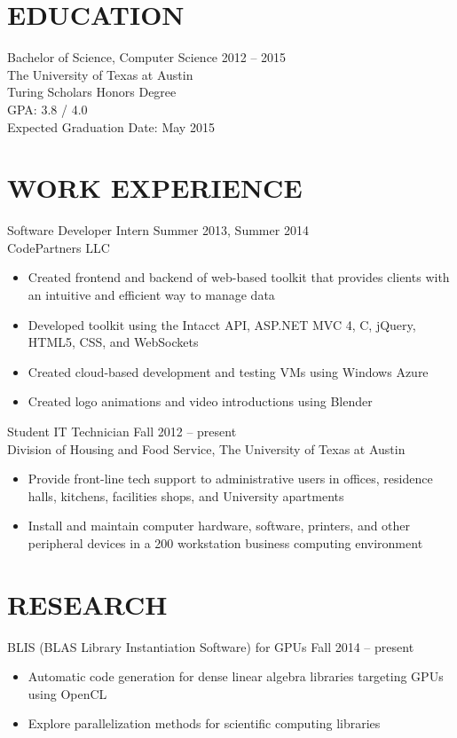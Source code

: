 \documentclass[margin]{res}
\newcommand{\PLUS}{\nolinebreak\hspace{-.05em}\raisebox{.4ex}{\tiny\bf+}}
\newcommand{\CS}{C\nolinebreak\hspace{-.05em}\raisebox{.4ex}{\scriptsize\bf \#}}
\begin{document}
\begin{resume}
 
\section{EDUCATION}
	Bachelor of Science, Computer Science \hfill 2012 -- 2015\\
	The University of Texas at Austin\\
	Turing Scholars Honors Degree\\
	GPA: 3.8 / 4.0\\
	Expected Graduation Date: May 2015

\vspace{-1mm}

\section{WORK EXPERIENCE}
	Software Developer Intern \hfill Summer 2013, Summer 2014 \\
	CodePartners LLC
	\begin{itemize} \itemsep -1pt %
	\item Created frontend and backend of web-based toolkit that provides clients with an intuitive and efficient way to manage data
	\item Developed toolkit using the Intacct API, ASP.NET MVC 4, \CS{}, jQuery, HTML5, CSS, and WebSockets
	\item Created cloud-based development and testing VMs using Windows Azure
	\item Created logo animations and video introductions using Blender
	\end{itemize}
 
	Student IT Technician \hfill Fall 2012 -- present \\
	Division of Housing and Food Service, The University of Texas at Austin
	\begin{itemize} \itemsep -2pt %
	\item Provide front-line tech support to administrative users in offices, residence halls, kitchens, facilities shops, and University apartments
	\item Install and maintain computer hardware, software, printers, and other peripheral devices in a 200\PLUS{} workstation business computing environment
	\end{itemize}

\section{RESEARCH}
	BLIS (BLAS Library Instantiation Software) for GPUs \hfill Fall 2014 -- present
	\begin{itemize} \itemsep -2pt
	\item Automatic code generation for dense linear algebra libraries targeting GPUs using OpenCL
	\item Explore parallelization methods for scientific computing libraries
	\end{itemize}


\end{resume}
\end{document}
